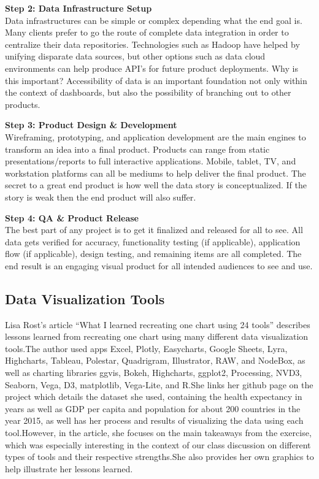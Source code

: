 \documentclass[]{book}
\theoremstyle{definition}
\theoremstyle{definition}
\theoremstyle{definition}
\theoremstyle{remark}
\begin{document}
\textbf{Step 2: Data Infrastructure Setup}\\
Data infrastructures can be simple or complex depending what the end
goal is. Many clients prefer to go the route of complete data
integration in order to centralize their data repositories. Technologies
such as Hadoop have helped by unifying disparate data sources, but other
options such as data cloud environments can help produce API's for
future product deployments. Why is this important? Accessibility of data
is an important foundation not only within the context of dashboards,
but also the possibility of branching out to other products.

\textbf{Step 3: Product Design \& Development}\\
Wireframing, prototyping, and application development are the main
engines to transform an idea into a final product. Products can range
from static presentations/reports to full interactive applications.
Mobile, tablet, TV, and workstation platforms can all be mediums to help
deliver the final product. The secret to a great end product is how well
the data story is conceptualized. If the story is weak then the end
product will also suffer.

\textbf{Step 4: QA \& Product Release}\\
The best part of any project is to get it finalized and released for all
to see. All data gets verified for accuracy, functionality testing (if
applicable), application flow (if applicable), design testing, and
remaining items are all completed. The end result is an engaging visual
product for all intended audiences to see and use.

\subsection{Data Visualization Tools}\label{data-visualization-tools-1}

Lisa Rost's article ``What I learned recreating one chart using 24
tools'' describes lessons learned from recreating one chart using many
different data visualization tools.The author used apps Excel, Plotly,
Easycharts, Google Sheets, Lyra, Highcharts, Tableau, Polestar,
Quadrigram, Illustrator, RAW, and NodeBox, as well as charting libraries
ggvis, Bokeh, Highcharts, ggplot2, Processing, NVD3, Seaborn, Vega, D3,
matplotlib, Vega-Lite, and R.She links her github page on the project
which details the dataset she used, containing the health expectancy in
years as well as GDP per capita and population for about 200 countries
in the year 2015, as well has her process and results of visualizing the
data using each tool.However, in the article, she focuses on the main
takeaways from the exercise, which was especially interesting in the
context of our class discussion on different types of tools and their
respective strengths.She also provides her own graphics to help
illustrate her lessons learned.
\end{document}
